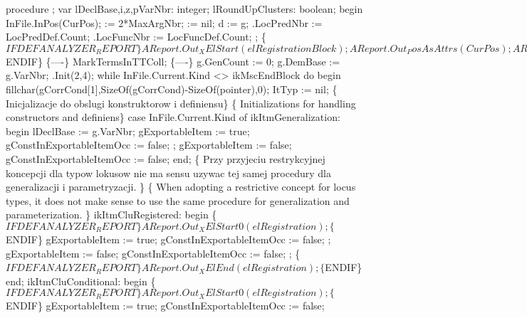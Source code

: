 procedure ;
var
   lDeclBase,i,z,pVarNbr: integer;
   lRoundUpClusters: boolean;
begin
   InFile.InPos(CurPos);
    := 2*MaxArgNbr;
    := nil;
   d := g;
   .LocPredNbr := LocPredDef.Count;
   .LocFuncNbr := LocFuncDef.Count;
   ;
   \{$IFDEF ANALYZER_REPORT\}
   AReport.Out_XElStart(elRegistrationBlock);
   AReport.Out_PosAsAttrs(CurPos);
   AReport.Out_XAttrEnd;
   \{$ENDIF\}
   \{----\}
   MarkTermsInTTColl;
   \{----\}
   g.GenCount := 0;
   g.DemBase := g.VarNbr;
   .Init(2,4);
   while InFile.Current.Kind <> ikMscEndBlock do
   begin
      fillchar(gCorrCond[1],SizeOf(gCorrCond)-SizeOf(pointer),0);
      ItTyp := nil;
      \{ Inicjalizacje do obslugi konstruktorow i definiensu\}
      \{ Initializations for handling constructors and definiens\}
      case InFile.Current.Kind of
         ikItmGeneralization:
            begin
               lDeclBase := g.VarNbr;
               gExportableItem := true;
               gConstInExportableItemOcc := false;
               ;
               gExportableItem := false;
               gConstInExportableItemOcc := false;
            end;
\{ Przy przyjeciu restrykcyjnej koncepcji dla typow lokusow nie ma sensu
  uzywac tej samej procedury dla generalizacji i parametryzacji.
\}
\{ When adopting a restrictive concept for locus types, it does not make sense
  to use the same procedure for generalization and parameterization.
\}
         ikItmCluRegistered:
            begin
               \{$IFDEF ANALYZER_REPORT\}
               AReport.Out_XElStart0(elRegistration);
               \{$ENDIF\}
               gExportableItem := true;
               gConstInExportableItemOcc := false;
               ;
               gExportableItem := false;
               gConstInExportableItemOcc := false;
               ;
               \{$IFDEF ANALYZER_REPORT\}
               AReport.Out_XElEnd(elRegistration);
               \{$ENDIF\}
            end;
         ikItmCluConditional:
            begin
               \{$IFDEF ANALYZER_REPORT\}
               AReport.Out_XElStart0(elRegistration);
               \{$ENDIF\}
               gExportableItem := true;
               gConstInExportableItemOcc := false;
